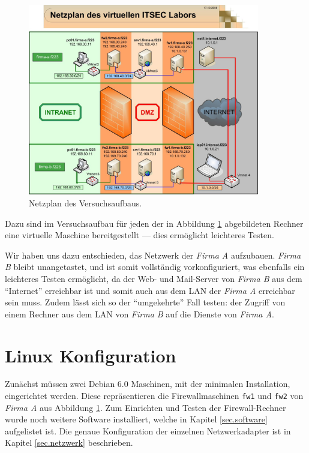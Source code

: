 \begin{figure}[h!]
  \centering
    \includegraphics[width=0.9\textwidth]{figures/Netzplan.jpg}
  \caption{Netzplan des Versuchsaufbaus.\cite{labor}}
  \label{fig.netzplan}
\end{figure}

Dazu sind im Versuchsaufbau für jeden der in Abbildung 
\ref{fig.netzplan} abgebildeten Rechner
eine virtuelle Maschine bereitgestellt --- dies ermöglicht leichteres
Testen.

Wir haben uns dazu entschieden, das Netzwerk der \emph{Firma A} aufzubauen.
\emph{Firma B} bleibt unangetastet, und ist somit vollständig vorkonfiguriert,
was ebenfalls ein leichteres Testen ermöglicht, da der Web- und Mail-Server von
\emph{Firma B} aus dem "`Internet"' erreichbar ist und somit auch aus dem LAN
der \emph{Firma A} erreichbar sein muss.
Zudem lässt sich so der "`umgekehrte"' Fall testen: der Zugriff von einem
Rechner aus dem LAN von \emph{Firma B} auf die Dienste von
\emph{Firma A}.\cite{labor}


\newpage
\section{Linux Konfiguration}

Zunächst müssen zwei Debian 6.0 Maschinen,
mit der minimalen Installation, eingerichtet werden.
Diese repräsentieren die Firewallmaschinen {\tt fw1} und {\tt fw2} von
\emph{Firma A} aus Abbildung \ref{fig.netzplan}.
Zum Einrichten und Testen der Firewall-Rechner wurde noch weitere Software
installiert, welche in Kapitel \ref{sec.software} aufgelistet ist.
Die genaue Konfiguration der einzelnen Netzwerkadapter ist in Kapitel
\ref{sec.netzwerk} beschrieben.


